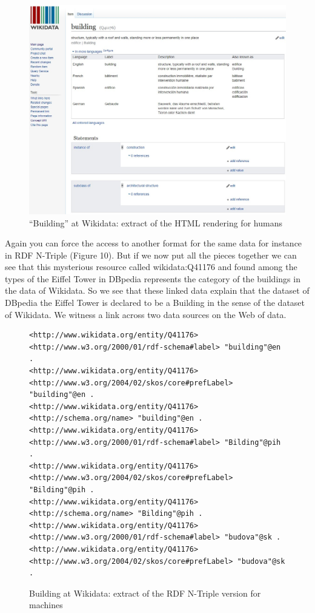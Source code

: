 \begin{figure}
    \centering
    \includegraphics[width=5.0in]{media/ch5/figure-05-09.jpg}
    \caption{``Building'' at Wikidata: extract of the HTML rendering for humans}
    \label{fig:ch5.9}
\end{figure}

Again you can force the access to another format for the same data for
instance in RDF N-Triple (Figure 10). But if we now put all the pieces
together we can see that this mysterious resource called wikidata:Q41176
and found among the types of the Eiffel Tower in DBpedia represents the
category of the buildings in the data of Wikidata. So we see that these
linked data explain that the dataset of DBpedia the Eiffel Tower is
declared to be a Building in the sense of the dataset of Wikidata. We
witness a link across two data sources on the Web of data.

\begin{figure}
 \begin{lstlisting}
<http://www.wikidata.org/entity/Q41176> <http://www.w3.org/2000/01/rdf-schema#label> "building"@en .
<http://www.wikidata.org/entity/Q41176> <http://www.w3.org/2004/02/skos/core#prefLabel> "building"@en .
<http://www.wikidata.org/entity/Q41176> <http://schema.org/name> "building"@en .
<http://www.wikidata.org/entity/Q41176> <http://www.w3.org/2000/01/rdf-schema#label> "Bilding"@pih .
<http://www.wikidata.org/entity/Q41176> <http://www.w3.org/2004/02/skos/core#prefLabel> "Bilding"@pih .
<http://www.wikidata.org/entity/Q41176> <http://schema.org/name> "Bilding"@pih .
<http://www.wikidata.org/entity/Q41176> <http://www.w3.org/2000/01/rdf-schema#label> "budova"@sk .
<http://www.wikidata.org/entity/Q41176> <http://www.w3.org/2004/02/skos/core#prefLabel> "budova"@sk .
\end{lstlisting}
    \caption{Building at Wikidata: extract of the RDF N-Triple version for
machines}
    \label{fig:ch5.10}
\end{figure}

